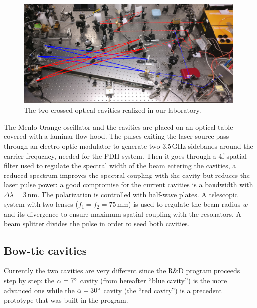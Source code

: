 \begin{figure}
	\centering
	\includegraphics[width=1\linewidth]{images/setup.jpg}
	\caption{The two crossed optical cavities realized in our laboratory.}
	\label{fig:setup}
\end{figure}
The Menlo Orange oscillator and the cavities are placed on an optical table covered with a laminar flow hood. The pulses exiting the laser source pass through an electro-optic modulator to generate two 3.5\,GHz sidebands around the carrier frequency, needed for the PDH system. Then it goes through a 4f spatial filter used to regulate the spectral width of the beam entering the cavities, a reduced spectrum improves the spectral coupling with the cavity but reduces the laser pulse power: a good compromise for the current cavities is a bandwidth with $\Delta\lambda = 3\,$nm.
The polarization is controlled with half-wave plates. A telescopic system with two lenses ($f_1 = f_2= 75$\,mm) is used to regulate the beam radius $w$ and its divergence to ensure maximum spatial coupling with the resonators. A beam splitter divides the pulse in order to seed both cavities.

\subsection{Bow-tie cavities}

Currently the two cavities are very different since the R\&D program proceeds step by step: the $\alpha = 7\degree$ cavity (from hereafter ``blue cavity'') is the more advanced one while the $\alpha = 30\degree$ cavity (the ``red cavity'') is a precedent prototype that was built in the program.

